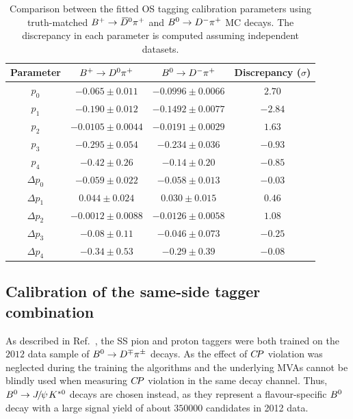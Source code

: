 \begin{table}[t!]
        \centering
        \caption{Comparison between the fitted OS tagging calibration parameters using truth-matched $B^+\rightarrow\kern 0.2em\overline{\kern -0.2em D}{}^0\pi^+$ and $B^0\rightarrow D^-\pi^+$ MC decays. The discrepancy in each parameter is computed assuming independent datasets.}
        \begin{tabular}{cccc}
          \toprule
          Parameter   &  $B^+\rightarrow D^0\pi^+$   &  $B^0\rightarrow D^-\pi^+$  &   Discrepancy ($\sigma$) \\
          \midrule
          $p_0$   &   $-0.065\pm0.011$   &   $-0.0996\pm0.0066$   &   $2.70$ \\
          $p_1$   &   $-0.190\pm0.012$   &   $-0.1492\pm0.0077$   &   $-2.84$ \\
          $p_2$   &   $-0.0105\pm0.0044$   &   $-0.0191\pm0.0029$   &   $1.63$ \\
          $p_3$   &   $-0.295\pm0.054$   &   $-0.234\pm0.036$   &   $-0.93$ \\
          $p_4$   &   $-0.42\pm0.26$   &   $-0.14\pm0.20$   &   $-0.85$ \\
          $\Delta p_0$   &   $-0.059\pm0.022$   &   $-0.058\pm0.013$   &   $-0.03$ \\
          $\Delta p_1$   &   $0.044\pm0.024$   &   $0.030\pm0.015$   &   $0.46$ \\
          $\Delta p_2$   &   $-0.0012\pm0.0088$   &   $-0.0126\pm0.0058$   &   $1.08$ \\
          $\Delta p_3$   &   $-0.08\pm0.11$   &   $-0.046\pm0.073$   &   $-0.25$ \\
          $\Delta p_4$   &   $-0.34\pm0.53$   &   $-0.29\pm0.39$   &   $-0.08$ \\
          \bottomrule
        \end{tabular}
        \label{tab:os_calib_portability_mc}
\end{table}

\subsection{Calibration of the same-side tagger combination}
\label{sec:tagging:SScalib}

As described in Ref.~\cite{LHCb-PAPER-2016-039}, the SS pion and proton taggers
were both trained on the $\num{2012}$ data sample of
$B^0\rightarrow D^\mp\pi^\pm$ decays. As the effect of $C\!P$ violation was neglected during the
training the algorithms and the underlying MVAs cannot be blindly used when
measuring $C\!P$ violation in the same decay channel. Thus, $\Bz\to\jpsi\Kstarz$
decays are chosen instead, as they represent a flavour-specific $B^0$ decay with
a large signal yield of about $350000$ candidates in 2012 data. 


